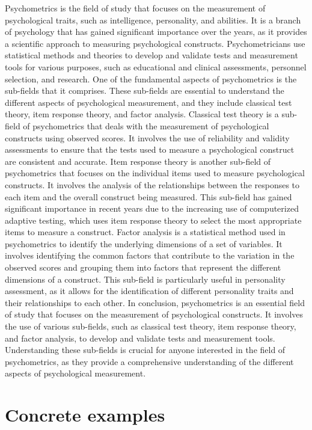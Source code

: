 \documentclass[12pt, a4paper]{exam}
\begin{document}
Psychometrics is the field of study that focuses on the measurement of psychological traits, such as intelligence, personality, and abilities. It is a branch of psychology that has gained significant importance over the years, as it provides a scientific approach to measuring psychological constructs. Psychometricians use statistical methods and theories to develop and validate tests and measurement tools for various purposes, such as educational and clinical assessments, personnel selection, and research. One of the fundamental aspects of psychometrics is the sub-fields that it comprises. These sub-fields are essential to understand the different aspects of psychological measurement, and they include classical test theory, item response theory, and factor analysis. Classical test theory is a sub-field of psychometrics that deals with the measurement of psychological constructs using observed scores. It involves the use of reliability and validity assessments to ensure that the tests used to measure a psychological construct are consistent and accurate. Item response theory is another sub-field of psychometrics that focuses on the individual items used to measure psychological constructs. It involves the analysis of the relationships between the responses to each item and the overall construct being measured. This sub-field has gained significant importance in recent years due to the increasing use of computerized adaptive testing, which uses item response theory to select the most appropriate items to measure a construct. Factor analysis is a statistical method used in psychometrics to identify the underlying dimensions of a set of variables. It involves identifying the common factors that contribute to the variation in the observed scores and grouping them into factors that represent the different dimensions of a construct. This sub-field is particularly useful in personality assessment, as it allows for the identification of different personality traits and their relationships to each other. In conclusion, psychometrics is an essential field of study that focuses on the measurement of psychological constructs. It involves the use of various sub-fields, such as classical test theory, item response theory, and factor analysis, to develop and validate tests and measurement tools. Understanding these sub-fields is crucial for anyone interested in the field of psychometrics, as they provide a comprehensive understanding of the different aspects of psychological measurement.

\section{Concrete examples}
\end{document}
